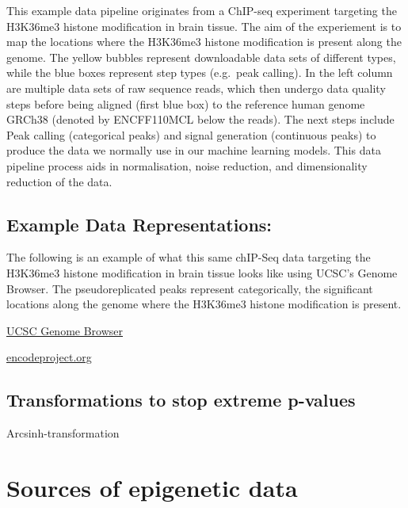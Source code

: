 \documentclass[
]{book}
\begin{document}
This example data pipeline originates from a ChIP-seq experiment targeting the H3K36me3 histone modification in brain tissue. The aim of the experiement is to map the locations where the H3K36me3 histone modification is present along the genome. The yellow bubbles represent downloadable data sets of different types, while the blue boxes represent step types (e.g.~peak calling). In the left column are multiple data sets of raw sequence reads, which then undergo data quality steps before being aligned (first blue box) to the reference human genome GRCh38 (denoted by ENCFF110MCL below the reads). The next steps include Peak calling (categorical peaks) and signal generation (continuous peaks) to produce the data we normally use in our machine learning models. This data pipeline process aids in normalisation, noise reduction, and dimensionality reduction of the data.

\subsection{Example Data Representations:}\label{example-data-representations}

The following is an example of what this same chIP-Seq data targeting the H3K36me3 histone modification in brain tissue looks like using UCSC's Genome Browser. The pseudoreplicated peaks represent categorically, the significant locations along the genome where the H3K36me3 histone modification is present.

\href{https://genome.ucsc.edu/cgi-bin/hgTracks?db=hg38&lastVirtModeType=default&lastVirtModeExtraState=&virtModeType=default&virtMode=0&nonVirtPosition=&position=chr1\%3A11084744\%2D11095920&hgsid=2307713234_Kap236Tjt6ZGnnNrXMkIhq2Ajn27}{UCSC Genome Browser}

\href{https://www.encodeproject.org/experiments/ENCSR875FZN/}{encodeproject.org}

\subsection{Transformations to stop extreme p-values}\label{transformations-to-stop-extreme-p-values}

Arcsinh-transformation

\section{Sources of epigenetic data}\label{sources-of-epigenetic-data}
\end{document}
